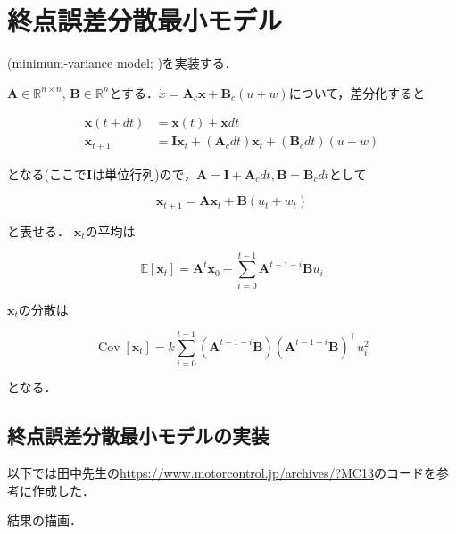 \section{終点誤差分散最小モデル}
\textbf{} (minimum-variance model; \cite{Harris1998-gj})を実装する．

$\mathbf{A}\in \mathbb{R}^{n\times n}$, $\mathbf{B}\in \mathbb{R}^{n}$とする．$\dot{x}=\mathbf{A}_{c}\mathbf{x}+\mathbf{B}_{c}(u + w)$について，差分化すると


\begin{align}
\mathbf{x}(t+dt)&=\mathbf{x}(t)+\dot{\mathbf{x}}dt\\
\mathbf{x}_{t+1}&=\mathbf{I}\mathbf{x}_t+(\mathbf{A}_{c}dt)\mathbf{x}_t+(\mathbf{B}_{c}dt)(u + w)
\end{align}


となる(ここで$\mathbf{I}$は単位行列)ので，$\mathbf{A}=\mathbf{I}+\mathbf{A}_{c}dt, \mathbf{B}=\mathbf{B}_cdt$として


\begin{equation}
\mathbf{x}_{t+1} = \mathbf{A} \mathbf{x}_t + \mathbf{B}(u_t + w_t)
\end{equation}


と表せる． $\mathbf{x}_t$の平均は


\begin{equation}
\mathbb{E}\left[\mathbf{x}_{t}\right]=\mathbf{A}^{t} \mathbf{x}_{0}+\sum_{i=0}^{t-1} \mathbf{A}^{t-1-i} \mathbf{B} u_{i}
\end{equation}


$\mathbf{x}_t$の分散は


\begin{equation}
\operatorname{Cov}\left[\mathbf{x}_{t}\right]=k \sum_{i=0}^{t-1}\left(\mathbf{A}^{t-1-i} \mathbf{B}\right)\left(\mathbf{A}^{t-1-i} \mathbf{B}\right)^{\top} u_{i}^{2}
\end{equation}


となる．
\subsection{終点誤差分散最小モデルの実装}
以下では田中先生の\url{https://www.motorcontrol.jp/archives/?MC13}のコードを参考に作成した．





結果の描画．


